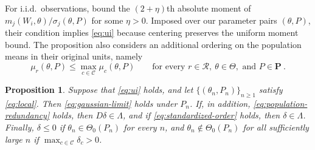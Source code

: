 \documentclass[11pt]{article}
\newcommand{\red}[1]{{\color{red}#1}} %
\numberwithin{equation}{section}
\newtheorem{proposition}{Proposition}
\theoremstyle{definition}
\begin{document}
\red{For i.i.d.\ observations, \citet[p.~124, condition (2.2)(vii)]{andrews/soares:10} bound the $(2+\eta)$th absolute moment of $m_j(W_i,\theta)/\sigma_j(\theta,P)$ for some $\eta>0$. Imposed over our parameter pairs $(\theta,P)$, their condition implies \eqref{eq:ui} because centering preserves the uniform moment bound. The proposition also considers an additional ordering on the population means in their original units, namely}
\begin{equation}\label{eq:population-redundancy}
\mu_r(\theta,P)\le\max_{c\in\mathcal C}\mu_c(\theta,P)
\qquad\text{for every }r\in\mathcal R,\ \theta\in\Theta,\text{ and }P\in\mathbf P~.
\end{equation}

\begin{proposition}\label{prop:local-limit}
Suppose that \eqref{eq:ui} holds, and let $\{(\theta_n,P_n)\}_{n\ge1}$ satisfy \eqref{eq:local}. Then \eqref{eq:gaussian-limit} holds under $P_n$. If, in addition, \eqref{eq:population-redundancy} holds, then $D\delta\in\Lambda$, and if \eqref{eq:standardized-order} holds, then $\delta\in\Lambda$. Finally, $\delta\le0$ if $\theta_n\in\Theta_0(P_n)$ for every $n$, and $\theta_n\notin\Theta_0(P_n)$ for all sufficiently large $n$ if $\max_{c\in\mathcal C}\delta_c>0$.
\end{proposition}
\end{document}
